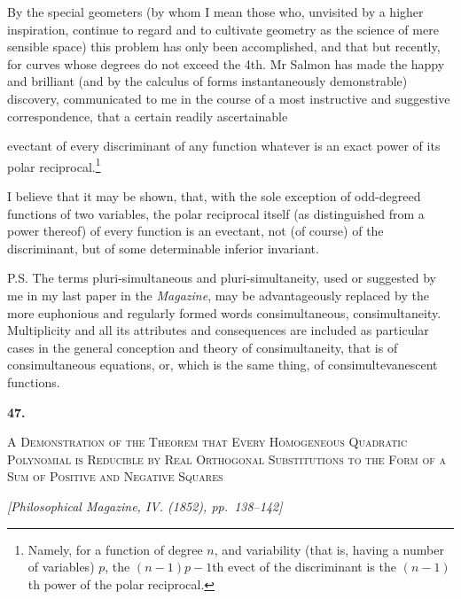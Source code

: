 \documentclass[11pt]{article}
\newcommand{\paperhead}[3]{%
  \clearpage
  \begin{center}
  {\Large\bfseries #1.}\par\vspace{0.85em}
  {\large\scshape #2}\par\vspace{0.6em}
  {\itshape [#3]}\par
  \end{center}\vspace{0.4em}}
\newcommand{\sourcepage}[1]{\marginpar{\scriptsize p.~#1}}
\begin{document}
{{By the special geometers (by whom I mean those who, unvisited by a higher inspiration, continue to regard and to cultivate geometry as the science of mere sensible space) this problem has only been accomplished, and that but recently, for curves whose degrees do not exceed the 4th. Mr Salmon has made the happy and brilliant (and by the calculus of forms instantaneously demonstrable) discovery, communicated to me in the course of a most instructive and suggestive correspondence, that a certain readily ascertainable

\sourcepage{377}
evectant of every discriminant of any function whatever is an exact power of its polar reciprocal.\footnote{Namely, for a function of degree $n$, and variability (that is, having a number of variables) $p$, the $(n-1)p-1$th evect of the discriminant is the $(n-1)$th power of the polar reciprocal.}

I believe that it may be shown, that, with the sole exception of odd-degreed functions of two variables, the polar reciprocal itself (as distinguished from a power thereof) of every function is an evectant, not (of course) of the discriminant, but of some determinable inferior invariant.

P.S. The terms pluri-simultaneous and pluri-simultaneity, used or suggested by me in my last paper in the \emph{Magazine}, may be advantageously replaced by the more euphonious and regularly formed words consimultaneous, consimultaneity. Multiplicity and all its attributes and consequences are included as particular cases in the general conception and theory of consimultaneity, that is of consimultaneous equations, or, which is the same thing, of consimultevanescent functions.


\paperhead{47}{A Demonstration of the Theorem that Every Homogeneous Quadratic Polynomial is Reducible by Real Orthogonal Substitutions to the Form of a Sum of Positive and Negative Squares}{Philosophical Magazine, IV. (1852), pp.~138--142}

}}
\end{document}
